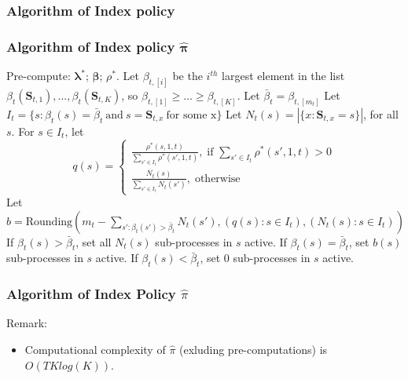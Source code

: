\documentclass{beamer}
\newcommand{\betav}{\pmb{\beta}}
\newcommand{\lambdav}{\pmb{\lambda}}
\newcommand{\allp}{\pmb{\pi}}
\newcommand{\allstater}{\mathbf{S}}
\newcommand{\substate}{s}
\begin{document}
\subsubsection{Algorithm of Index policy}
\begin{frame}[plain]
\frametitle{Algorithm of Index policy $\hat{\allp}$}
\vspace{-0.3cm}
\begin{algorithm}[H]
\footnotesize
\begin{algorithmic}
\STATE Pre-compute: $\lambdav^*$; $\betav$; $\rho^*$. 
    \STATE Let $\beta_{t,[i]}$ be the $i^{th}$ largest element in the list $\beta_t(\allstater_{t,1}),...,\beta_t(\allstater_{t,K})$, so $\beta_{t,[1]}\geq\ldots\geq \beta_{t,[K]}$. 
    \STATE Let $\bar{\beta}_t = \beta_{t,[m_t]}$
    \STATE Let $I_t=\{\substate : \beta_t(s)=\bar{\beta}_t\ \text{and}\ s=\allstater_{t,x}\ \text{for some x}\}$
    \STATE Let $N_t(s) = |\{x:\allstater_{t,x}=s\}|$, for all $\substate$.
    \STATE For $\substate\in I_t$, let 
    $$
    q(s) = 
    \begin{cases}
	\frac{\rho^*(s,1,t)}{\sum_{s'\in I_t}\rho^*(s',1,t)}, \; \text{if } \sum_{s'\in I_t}\rho^*(s',1,t)>0\\
	\frac{N_t(s)}{\sum_{s'\in I_t} N_t(s')}, \; \text{otherwise}
    \end{cases}
    $$
    Let $b = \mathrm{Rounding}(m_t-\sum_{s':\beta_t(s')>\bar{\beta}_t}N_t(s'),
    (q(s):s\in I_t),(N_t(s):s\in I_t))$
    \FOR{all $\substate$}
    \STATE If $\beta_t(s)>\bar{\beta}_t$, set all $N_t(s)$ sub-processes in $s$ active.
    \STATE If $\beta_t(s)= \bar{\beta}_t$, set $b(s)$ sub-processes in $s$ active.
    \STATE If $\beta_t(s)< \bar{\beta}_t$, set 0 sub-processes in $s$ active.
    \ENDFOR
  \ENDFOR
\end{algorithmic}
\end{algorithm}

\end{frame}

\begin{frame}[plain]
\frametitle{Algorithm of Index Policy $\hat{\pi}$}
Remark:
\begin{itemize}
\item Computational complexity of $\hat{\pi}$ (exluding pre-computations) is $O(TKlog(K))$.
\end{itemize}
\end{frame}
\end{document}
